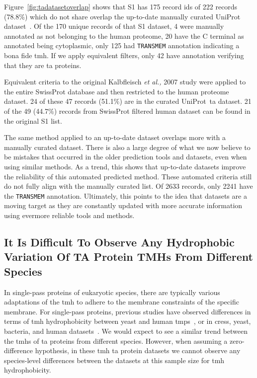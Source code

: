 Figure~\ref{fig:tadatasetoverlap} shows that S1 has 175 record ids of 222 records (78.8\%) which do not share overlap the up-to-date manually curated UniProt dataset~\cite{TheUniProtConsortium2014}.
Of the 170 unique records of that S1 dataset, 4 were manually annotated as not belonging to the human proteome, 20 have the C terminal as annotated being cytoplasmic, only 125 had \texttt{TRANSMEM} annotation indicating a bona fide \gls{tmh}.
If we apply equivalent filters, only 42 have annotation verifying that they are \gls{ta} proteins.

Equivalent criteria to the original Kalbfleisch \textit{et al.,} 2007 \cite{Kalbfleisch2007} study were applied to the entire SwissProt database and then restricted to the human proteome dataset.
24 of these 47 records (51.1\%) are in the curated UniProt~\gls{ta}  dataset.
21 of the 49 (44.7\%) records from SwissProt filtered human dataset can be found in the original S1 list.

The same method applied to an up-to-date dataset overlaps more with a manually curated dataset.
There is also a large degree of what we now believe to be mistakes that occurred in the older prediction tools and datasets, even when using similar methods.
As a trend, this shows that up-to-date datasets improve the reliability of this automated predicted method.
These automated criteria still do not fully align with the manually curated list.
Of 2633 records, only 2241 have the \texttt{TRANSMEM} annotation.
Ultimately, this points to the idea that datasets are a moving target as they are constantly updated with more accurate information using evermore reliable tools and methods.

\subsection{It Is Difficult To Observe Any Hydrophobic Variation Of TA Protein TMHs From Different Species}

In single\--pass proteins of eukaryotic species, there are typically various adaptations of the \gls{tmh} to adhere to the membrane constraints of the specific membrane.
For single\--pass proteins, previous studies have observed differences in terms of \gls{tmh} hydrophobicity between yeast and human \gls{tmp}s~\cite{Sharpe2010}, or in cress, yeast, bacteria, and human datasets~\cite{Baker2017}.
We would expect to see a similar trend between the \gls{tmh}s of \gls{ta} proteins from different species.
However, when assuming a zero-difference hypothesis, in these \gls{tmh} \gls{ta} protein datasets we cannot observe any species-level differences between the datasets at this sample size for \gls{tmh} hydrophobicity.

